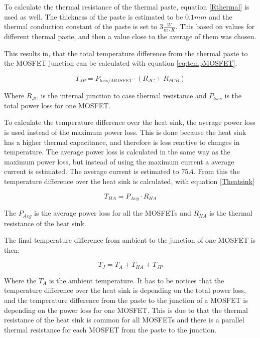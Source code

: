 To calculate the thermal resistance of the thermal paste, equation \ref{Rthermal} is used as well. The thickness of the paste is estimated to be $0.1 mm$ and the thermal conduction constant of the paste is set to $3 \frac{W}{m \cdot K}$. This based on values for different thermal paste, and then a value close to the average of them was chosen.

This results in, that the total temperature difference from the thermal paste to the MOSFET junction can be calculated with equation \ref{eq:tempMOSFET}.

    \begin{equation}
        T_{JP} = P_{loss/MOSFET} \cdot (R_{JC} + R_{PCB})
        \label{eq:tempMOSFET}
    \end{equation}
    
Where $R_{JC}$ is the internal junction to case thermal resistance and $P_{loss}$ is the total power loss for one MOSFET. 

To calculate the temperature difference over the heat sink, the average power loss is used instead of the maximum power loss. This is done because the heat sink has a higher thermal capacitance, and therefore is less reactive to changes in temperature. The average power loss is calculated in the same way as the maximum power loss, but instead of using the maximum current a average current is estimated. The average current is estimated to $75 A$.
From this the temperature difference over the heat sink is calculated, with equation \ref{Theatsink} 

    \begin{equation}
        T_{HA} = P_{Avg} \cdot R_{HA}
        \label{Theatsink}
    \end{equation}

The $P_{Avg}$ is the average power loss for all the MOSFETs and $R_{HA}$ is the thermal resistance of the heat sink. 

The final temperature difference from ambient to the junction of one MOSFET is then:

    \begin{equation}
        T_{J} = T_A + T_{HA} + T_{JP}
        \label{Theatsink}
    \end{equation}
    
Where the $T_A$ is the ambient temperature. It has to be notices that the temperature difference over the heat sink is depending on the total power loss, and the temperature difference from the paste to the junction of a MOSFET is depending on the power loss for one MOSFET. This is due to that the thermal resistance of the heat sink is common for all MOSFETs and there is a parallel thermal resistance for each MOSFET from the paste to the junction.

